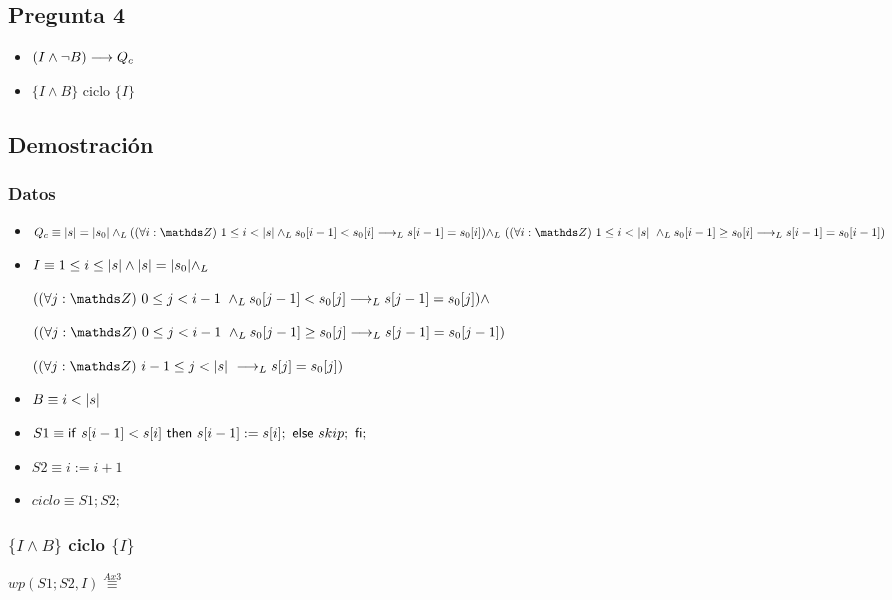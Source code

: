 \documentclass{article}
\begin{document}
\subsection*{Pregunta 4}
\begin{itemize}
    \item $(I \wedge \neg B) \longrightarrow Q_{c}$
    \item $\{I \wedge B\}$ ciclo $\{ I \}$
\end{itemize}

\subsection*{Demostración}
\subsubsection*{Datos}
\begin{itemize}
    \item $Q_{c}    \equiv \longitud{s} = \longitud{s_0} \yLuego (\paraTodo{i}{1}{\longitud{s} \yLuego s_0[i-1] < s_0[i] \implicaLuego s[i-1]=s_0[i])  \yLuego $
    
    $(\paraTodo{i}{1}{\longitud{s}} \yLuego s_0[i-1] \geq s_0[i] \implicaLuego s[i-1] = s_0[i-1])}$

    \item $I        \equiv 1 \leq i \leq |s| \wedge |s| = |s_0| \land _L$

    $(\paraTodo{j}{0}{i-1} \yLuego s_0[j-1] < s_0[j] \implicaLuego s[j-1] = s_0[j]) \wedge $

    $(\paraTodo{j}{0}{i-1} \yLuego s_0[j-1] \geq s_0[j] \implicaLuego s[j-1] = s_0[j-1])$

    $(\paraTodo{j}{i-1}{\longitud{s}} \implicaLuego s[j] = s_0[j])$

    \item $B        \equiv i < |s|$
    \item $S1       \equiv \mathsf{if}\ s[i-1] < s[i]\ \mathsf{then}\ s[i-1]:= s[i];\ \mathsf{else}\ skip;\ \mathsf{fi};$
    \item $S2       \equiv i := i + 1$
    \item $ciclo    \equiv S1;S2;$
\end{itemize}

\subsubsection*{$\{I \wedge B\}$ ciclo $\{ I \}$}

$wp(S1;S2, I) \stackrel{Ax3}{\equiv}$
\end{document}
